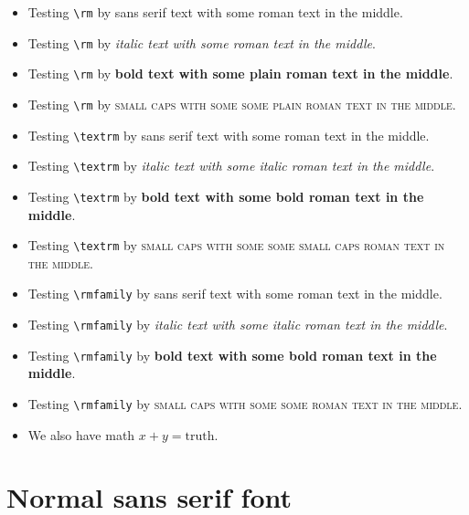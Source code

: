 \documentclass{article}
\begin{document}
\begin{itemize}
\item
Testing \verb#\rm# by \textsf{sans serif text with {\rm some roman text} in the middle}.
\item
Testing \verb#\rm# by \textit{italic text with {\rm some roman text} in the middle}.
\item
Testing \verb#\rm# by \textbf{bold text with {\rm some plain roman text} in the middle}.
\item
Testing \verb#\rm# by \textsc{small caps with some {\rm some plain roman text} in the middle}.
\item
Testing \verb#\textrm# by \textsf{sans serif text with \textrm{some roman text} in the middle}.
\item
Testing \verb#\textrm# by \textit{italic text with \textrm{some italic roman text} in the middle}.
\item
Testing \verb#\textrm# by \textbf{bold text with \textrm{some bold roman text} in the middle}.
\item
Testing \verb#\textrm# by \textsc{small caps with some \textrm{some small caps roman text} in the middle}.
\item
Testing \verb#\rmfamily# by \textsf{sans serif text with {\rmfamily some roman text} in the middle}.
\item
Testing \verb#\rmfamily# by \textit{italic text with {\rmfamily some italic roman text} in the middle}.
\item
Testing \verb#\rmfamily# by \textbf{bold text with {\rmfamily some bold roman text} in the middle}.
\item
Testing \verb#\rmfamily# by \textsc{small caps with some {\rmfamily some roman text} in the middle}.
\item
We also have math $x+y = \mathrm{truth}$.
\end{itemize}

\section{Normal sans serif font}
\end{document}
